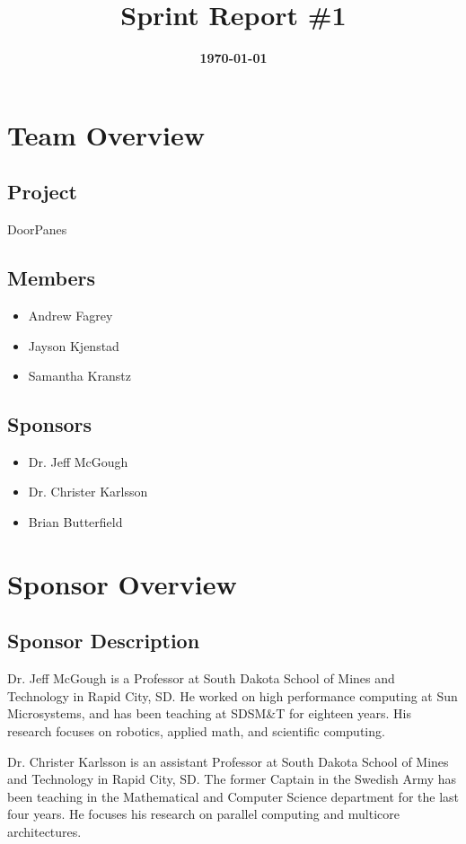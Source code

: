 \documentclass{article}
\title{\normalfont\Large\bfseries\color{TitleColor}Sprint Report \#1}
\date{\normalfont\bfseries\color{TitleColor}\today}
\begin{document}
\maketitle

\section*{Team Overview}
\subsection*{Project}
{DoorPanes}

\subsection*{Members}
\begin{itemize}
	\item Andrew Fagrey
	\item Jayson Kjenstad
	\item Samantha Kranstz
\end{itemize}

\subsection*{Sponsors}
\begin{itemize}
	\item Dr. Jeff McGough
	\item Dr. Christer Karlsson
	\item Brian Butterfield
\end{itemize}

\section*{Sponsor Overview}
\subsection*{Sponsor Description}
Dr. Jeff McGough is a Professor at South Dakota School of Mines and Technology in Rapid City, SD. He worked on high performance computing at Sun Microsystems, and has been teaching at SDSM\&T for eighteen years. His research focuses on robotics, applied math, and scientific computing.\newline 

Dr. Christer Karlsson is an assistant Professor at South Dakota School of Mines and Technology in Rapid City, SD. The former Captain in the Swedish Army has been teaching in the Mathematical and Computer Science department for the last four years. He focuses his research on parallel computing and multicore architectures. \newline
\end{document}
